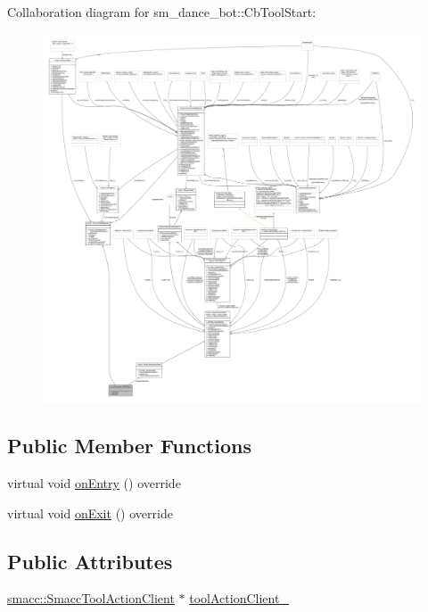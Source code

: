Collaboration diagram for sm\+\_\+dance\+\_\+bot\+:\+:Cb\+Tool\+Start\+:
\nopagebreak
\begin{figure}[H]
\begin{center}
\leavevmode
\includegraphics[width=350pt]{classsm__dance__bot_1_1CbToolStart__coll__graph}
\end{center}
\end{figure}
\subsection*{Public Member Functions}
\begin{DoxyCompactItemize}
\item 
virtual void \hyperlink{classsm__dance__bot_1_1CbToolStart_ada528d3305c51d88ee9dace1087b258a}{on\+Entry} () override
\item 
virtual void \hyperlink{classsm__dance__bot_1_1CbToolStart_a5cb9f2b22b8039e3745f997cd2301775}{on\+Exit} () override
\end{DoxyCompactItemize}
\subsection*{Public Attributes}
\begin{DoxyCompactItemize}
\item 
\hyperlink{classsmacc_1_1SmaccToolActionClient}{smacc\+::\+Smacc\+Tool\+Action\+Client} $\ast$ \hyperlink{classsm__dance__bot_1_1CbToolStart_af0d815c686d7f5cc6d16c3f8ec2443c4}{tool\+Action\+Client\+\_\+}
\end{DoxyCompactItemize}


